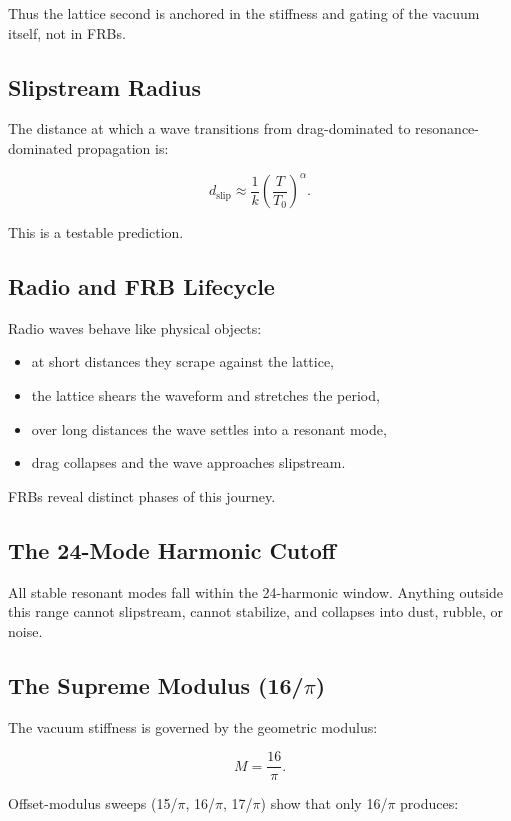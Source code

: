 \documentclass[12pt,oneside]{book}
\begin{document}
Thus the lattice second is anchored in the stiffness and gating of the vacuum itself, not in FRBs.

\subsection{Slipstream Radius}
The distance at which a wave transitions from drag-dominated to resonance-dominated propagation is:



\[
d_{\mathrm{slip}} \approx \frac{1}{k} \left(\frac{T}{T_0}\right)^\alpha.
\]



This is a testable prediction.

\subsection{Radio and FRB Lifecycle}
Radio waves behave like physical objects:

\begin{itemize}
    \item at short distances they scrape against the lattice,
    \item the lattice shears the waveform and stretches the period,
    \item over long distances the wave settles into a resonant mode,
    \item drag collapses and the wave approaches slipstream.
\end{itemize}

FRBs reveal distinct phases of this journey.

\subsection{The 24-Mode Harmonic Cutoff}
All stable resonant modes fall within the 24-harmonic window.  
Anything outside this range cannot slipstream, cannot stabilize, and collapses into dust, rubble, or noise.

\subsection{The Supreme Modulus (16/$\pi$)}
The vacuum stiffness is governed by the geometric modulus:



\[
M = \frac{16}{\pi}.
\]



Offset-modulus sweeps (15/$\pi$, 16/$\pi$, 17/$\pi$) show that only 16/$\pi$ produces:
\end{document}
